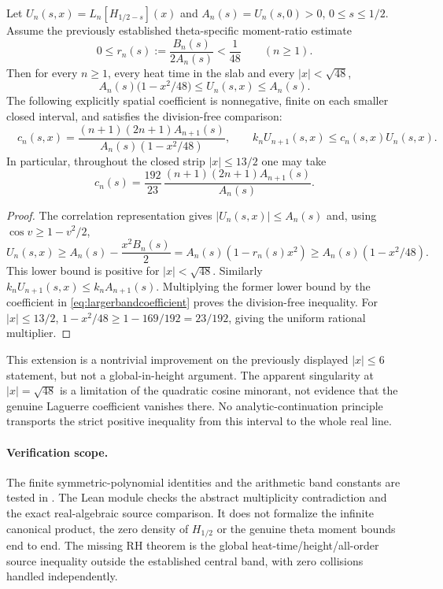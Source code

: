 \begin{proposition}
\label{prop:largerband}
Let $U_n(s,x)=L_n[H_{1/2-s}](x)$ and
$A_n(s)=U_n(s,0)>0$, $0\le s\le1/2$.
Assume the previously established theta-specific
moment-ratio estimate
\[
0\le r_n(s):=\frac{B_n(s)}{2A_n(s)}<\frac1{48}
\qquad(n\ge1).
\]
Then for every $n\ge1$, every heat time in the slab
and every $|x|<\sqrt{48}$,
\begin{equation}
\boxed{A_n(s)\bigl(1-x^2/48\bigr)
       \le U_n(s,x)\le A_n(s).}
\label{eq:largerbandlower}
\end{equation}
The following explicitly spatial coefficient is
nonnegative, finite on each smaller closed interval,
and satisfies the division-free comparison:
\begin{equation}
\boxed{\quad
c_n(s,x)=
\frac{(n+1)(2n+1)A_{n+1}(s)}
     {A_n(s)(1-x^2/48)},\qquad
k_nU_{n+1}(s,x)\le c_n(s,x)U_n(s,x).\quad}
\label{eq:largerbandcoefficient}
\end{equation}
In particular, throughout the closed strip
$|x|\le13/2$ one may take
\[
c_n(s)=\frac{192}{23}\,
\frac{(n+1)(2n+1)A_{n+1}(s)}{A_n(s)}.
\]
\end{proposition}
\begin{proof}
The correlation representation gives
$|U_n(s,x)|\le A_n(s)$ and,
using $\cos v\ge1-v^2/2$,
\[
U_n(s,x)\ge A_n(s)-\frac{x^2B_n(s)}2
=A_n(s)(1-r_n(s)x^2)
\ge A_n(s)(1-x^2/48).
\]
This lower bound is positive for
$|x|<\sqrt{48}$. Similarly
$k_nU_{n+1}(s,x)\le k_nA_{n+1}(s)$.
Multiplying the former lower bound by the
coefficient in \eqref{eq:largerbandcoefficient}
proves the division-free inequality.
For $|x|\le13/2$,
$1-x^2/48\ge 1-169/192=23/192$,
giving the uniform rational multiplier.
\end{proof}

This extension is a nontrivial improvement on the
previously displayed $|x|\le6$ statement, but not a
global-in-height argument. The apparent singularity
at $|x|=\sqrt{48}$ is a limitation of the quadratic
cosine minorant, not evidence that the genuine
Laguerre coefficient vanishes there.
No analytic-continuation principle transports the
strict positive inequality from this interval to
the whole real line.

\paragraph{Verification scope.}
The finite symmetric-polynomial identities and
the arithmetic band constants are tested in
.
The Lean module
 checks
the abstract multiplicity contradiction and
the exact real-algebraic source comparison.
It does not formalize the infinite canonical product,
the zero density of $H_{1/2}$ or the genuine theta
moment bounds end to end. The missing RH theorem
is the global heat-time/height/all-order source
inequality outside the established central band,
with zero collisions handled independently.
